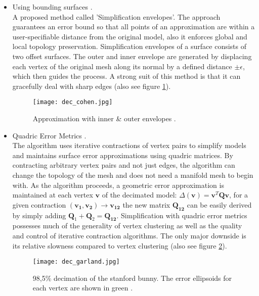 \begin{itemize}
    \item Using bounding surfaces \citep[cf.][]{Cohen1996}.\\
A proposed method called 'Simplification envelopes'.
The approach guarantees an error bound so that all points of an approximation are within a user-specifiable distance from the original model, also it enforces global and local topology preservation.
Simplification envelopes of a surface consists of two offset surfaces.
The outer and inner envelope are generated by displacing each vertex of the original mesh along its normal by a defined distance $\pm\epsilon$, which then guides the process.
A strong suit of this method is that it can gracefully deal with sharp edges (also see figure \ref{fig:dec_cohen}).
\begin{figure}[ht]
\centering
\texttt{[image: dec\_cohen.jpg]}
\caption{Approximation with inner \& outer envelopes \citep[][pp.123-124]{Cohen1996}.}
\label{fig:dec_cohen}
\end{figure}

    \item Quadric Error Metrics \citep[cf.][]{Garland1997}.\\
The algorithm uses iterative contractions of vertex pairs to simplify models and maintains surface error approximations using quadric matrices.
By contracting arbitrary vertex pairs and not just edges, the algorithm can change the topology of the mesh and does not need a manifold mesh to begin with.
As the algorithm proceeds, a geometric error approximation is maintained at each vertex $\mathbf{v}$ of the decimated model: $\Delta(\mathbf{v})= \mathbf{v}^{T}\mathbf{Q}\mathbf{v}$, for a given contraction $(\mathbf{v_{1}},\mathbf{v_{2}}) \rightarrow \mathbf{v_{12}}$ the new matrix $\mathbf{Q_{12}}$ can be easily derived by simply adding $\mathbf{Q}_{1} + \mathbf{Q}_{2} = \mathbf{Q_{12}}$.
Simplification with quadric error metrics possesses much of the generality of vertex clustering as well as the quality and control of iterative contraction algorithms.
The only major downside is its relative slowness compared to vertex clustering (also see figure \ref{fig:dec_garland}).
\begin{figure}[ht]
\centering
\texttt{[image: dec\_garland.jpg]}
\caption{98,5\% decimation of the stanford bunny. The error ellipsoids for each vertex are shown in green \citep[][p.215]{Garland1997}.}
\label{fig:dec_garland}
\end{figure}


\end{itemize}
